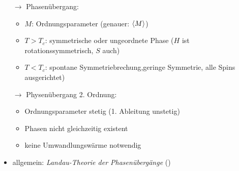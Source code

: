 \begin{itemize}
    \item[$\rightarrow$] Phasenübergang:
    \begin{itemize}
        \item $M$: Ordnungsparameter (genauer: $\expval{M}$)
        \item $T>T_c$: symmetrische oder ungeordnete Phase ($H$ ist rotationssymmetrisch, $S$ auch)
        \item $T<T_c$: spontane Symmetriebrechung,geringe Symmetrie, alle Spins ausgerichtet)
    \end{itemize}
    \item[$\rightarrow$] Physenübergang 2. Ordnung:
    \begin{itemize}
        \item Ordnungsparameter stetig (1. Ableitung unstetig)
        \item Phasen nicht gleichzeitig existent
        \item keine Umwandlungswärme notwendig
    \end{itemize}
    \item allgemein: \emph{Landau-Theorie der Phasenübergänge} ()
\end{itemize}

